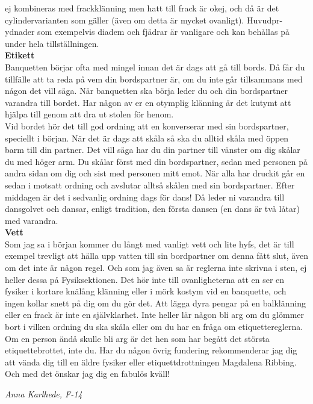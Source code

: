 \documentclass[a6paper,12pt]{article}
\begin{document}
ej kombineras med frackklänning men hatt till frack är okej, och då 
är det cylindervarianten som gäller (även om detta är mycket ovanligt). 
Huvudpr-\\
ydnader som exempelvis diadem och fjädrar är vanligare och kan 
behållas på under hela tillställningen.\\
\normalsize\textbf{Etikett}\\
\footnotesize Banquetten börjar ofta med mingel innan det är dags att gå 
till bords. Då får du tillfälle att ta reda på vem din bordspartner är, 
om du inte går tillsammans med någon det vill säga. När banquetten 
ska börja leder du och din bordspartner varandra till bordet. Har någon 
av er en otymplig klänning är det kutymt att hjälpa till genom att dra 
ut stolen för henom.\\
Vid bordet hör det till god ordning att en konverserar med sin bordspartner, 
speciellt i början. När det är dags att skåla så ska du alltid skåla med 
öppen barm
\newpage
\setlength{\oddsidemargin}{-0.57in}
\noindent
till din partner. Det vill säga har du din partner till vänster om dig 
skålar du med höger arm. Du skålar först med din bordspartner, sedan med 
personen på andra sidan om dig och sist med personen mitt emot. När alla 
har druckit går en sedan i motsatt ordning och avslutar alltså skålen 
med sin bordspartner. Efter middagen är det i sedvanlig ordning dags 
för dans! Då leder ni varandra till dansgolvet och dansar, enligt tradition, 
den första dansen (en dans är två låtar) med varandra.\\
\normalsize\textbf{Vett}\\
\footnotesize Som jag sa i början kommer du långt med vanligt vett och 
lite hyfs, det är till exempel trevligt att hälla upp vatten till sin 
bordpartner om denna fått slut, även om det inte är någon regel. Och som 
jag även sa är reglerna inte skrivna i sten, ej heller dessa på 
Fysiksektionen. Det hör inte till ovanligheterna att en ser en fysiker i 
kortare knälång klänning eller i mörk kostym vid en banquette, och ingen 
kollar snett på dig om du gör det. Att lägga dyra pengar på en balklänning 
eller en frack är inte en självklarhet. Inte heller lär någon bli arg om du 
glömmer bort i vilken ordning du ska skåla eller om du har en fråga om 
etiquettereglerna. Om en person ändå skulle bli arg är det hen som har begått 
det största etiquettebrottet, inte du. Har du någon övrig fundering 
rekommenderar jag dig att vända dig till en äldre fysiker eller 
etiquettdrottningen Magdalena Ribbing.\\
\indent Och med det önskar jag dig en fabulös kväll!
\begin{flushright}
\textit{Anna Karlhede, F-14}
\end{flushright}
\end{document}
